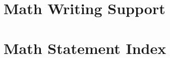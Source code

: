 
    \section{Math Writing Support}


    \section{Math Statement Index}
        \begin{definition}[]
            
        \end{definition}